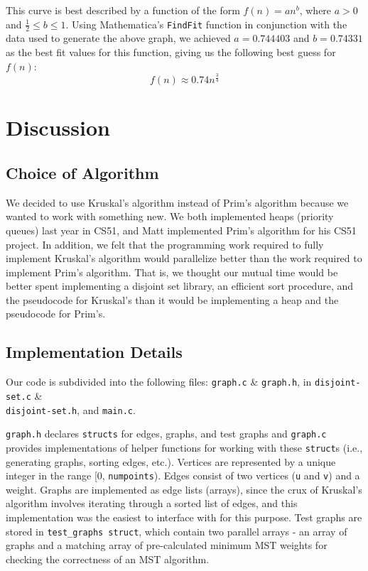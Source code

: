 \documentclass[solution, letterpaper]{cs121}
\begin{document}
This curve is best described by a function of the form $f(n)=an^b$, where $a > 0$ and $\frac{1}{2} \leq b \leq 1$. Using Mathematica's {\tt FindFit} function in conjunction with the data used to generate the above graph, we achieved $a=0.744403$ and $b=0.74331$ as the best fit values for this function, giving us the following best guess for $f(n)$:
\[f(n) \approx 0.74n^{\frac{3}{4}}\]

\section*{Discussion}
\subsection*{Choice of Algorithm}
\hspace{5mm} We decided to use Kruskal's algorithm instead of Prim's algorithm because we wanted to work with something new. We both implemented heaps (priority queues) last year in CS51, and Matt implemented Prim's algorithm for his CS51 project. In addition, we felt that the programming work required to fully implement Kruskal's algorithm would parallelize better than the work required to implement Prim's algorithm. That is, we thought our mutual time would be better spent implementing a disjoint set library, an efficient sort procedure, and the pseudocode for Kruskal's than it would be implementing a heap and the pseudocode for Prim's.

\subsection*{Implementation Details}
\hspace{5mm} Our code is subdivided into the following files: \texttt{graph.c} \& \texttt{graph.h}, in \texttt{disjoint-set.c} \& \\\texttt{disjoint-set.h}, and \texttt{main.c}.

\texttt{graph.h} declares \texttt{structs} for edges, graphs, and test graphs and \texttt{graph.c} provides implementations of helper functions for working with these \texttt{struct}s (i.e., generating graphs, sorting edges, etc.). Vertices are represented by a unique integer in the range [0, \texttt{numpoints}). Edges consist of two vertices (\texttt{u} and \texttt{v}) and a weight. Graphs are implemented as edge lists (arrays), since the crux of Kruskal's algorithm involves iterating through a sorted list of edges, and this implementation was the easiest to interface with for this purpose. Test graphs are stored in \texttt{test\_graphs struct}, which contain two parallel arrays - an array of graphs and a matching array of pre-calculated minimum MST weights for checking the correctness of an MST algorithm.
\end{document}
